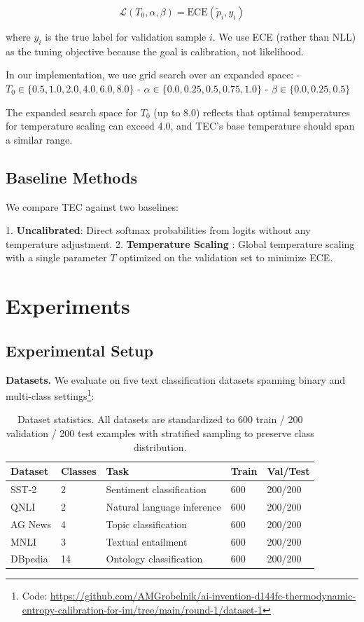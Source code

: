 \documentclass[11pt,letterpaper]{article}
\begin{document}
$$\mathcal{L}(T_0, \alpha, \beta) = \text{ECE}(\tilde{p}_i, y_i)$$

where $y_i$ is the true label for validation sample $i$. We use ECE (rather than NLL) as the tuning objective because the goal is calibration, not likelihood.

In our implementation, we use grid search over an expanded space:
- $T_0 \in \{0.5, 1.0, 2.0, 4.0, 6.0, 8.0\}$
- $\alpha \in \{0.0, 0.25, 0.5, 0.75, 1.0\}$
- $\beta \in \{0.0, 0.25, 0.5\}$

The expanded search space for $T_0$ (up to 8.0) reflects that optimal temperatures for temperature scaling can exceed 4.0, and TEC's base temperature should span a similar range.

\subsection{Baseline Methods}

We compare TEC against two baselines:

1. \textbf{Uncalibrated}: Direct softmax probabilities from logits without any temperature adjustment.
2. \textbf{Temperature Scaling} \cite{Guo2017}: Global temperature scaling with a single parameter $T$ optimized on the validation set to minimize ECE.

\section{Experiments}

\subsection{Experimental Setup}

\textbf{Datasets.} We evaluate on five text classification datasets spanning binary and multi-class settings\footnote{Code: \url{https://github.com/AMGrobelnik/ai-invention-d144fc-thermodynamic-entropy-calibration-for-im/tree/main/round-1/dataset-1}}:

\begin{table}[!htbp]
  \centering
  \begin{tabular}{lllll}
    \toprule
    Dataset & Classes & Task & Train & Val/Test \\
    \midrule
    SST-2 & 2 & Sentiment classification & 600 & 200/200 \\
    QNLI & 2 & Natural language inference & 600 & 200/200 \\
    AG News & 4 & Topic classification & 600 & 200/200 \\
    MNLI & 3 & Textual entailment & 600 & 200/200 \\
    DBpedia & 14 & Ontology classification & 600 & 200/200 \\
    \bottomrule
  \end{tabular}
  \caption{Dataset statistics. All datasets are standardized to 600 train / 200 validation / 200 test examples with stratified sampling to preserve class distribution.}
  \label{tab:datasets}
\end{table}
\end{document}
